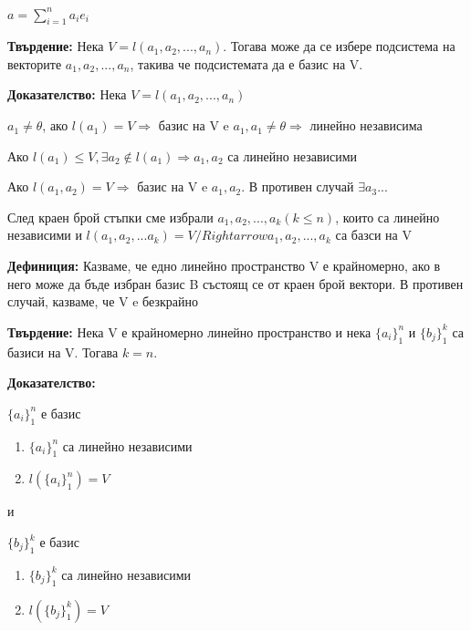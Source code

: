 \documentclass[fleqn,12pt]{article}
\begin{document}
\begin{flushleft}
        $ a = \sum_{i=1}^{n} a_i e_i$

    
    \vspace{5mm}

    \textbf{Твърдение:} Нека $ V = l(a_1, a_2, ..., a_n) $. Тогава може да се избере подсистема на векторите $ a_1, a_2, ..., a_n $, такива че подсистемата да е базис на V.

    \vspace{5mm}
    
        \textbf{Доказателство:}
        Нека $ V = l(a_1, a_2, ..., a_n) $

        $ a_1 \neq \theta $, ако $ l(a_1) = V \Rightarrow $ базис на V e $a_1, a_1 \neq \theta \Rightarrow $ линейно независима

        Ако $ l(a_1) \leq V, \exists a_2 \notin l(a_1) \Rightarrow a_1, a_2 $ са линейно независими

        Ако $ l(a_1, a_2) = V \Rightarrow $ базис на V e $a_1, a_2$. В противен случай $\exists a_3 ...$

        След краен брой стъпки сме избрали $a_1, a_2, ..., a_k (k \leq n) $, които са линейно независими и $l(a_1, a_2, ... a_k) = V /Rightarrow a_1, a_2, ..., a_k $ са базси на V
    
    \vspace{5mm}
    
    \textbf{Дефиниция:} Казваме, че едно линейно пространство V е крайномерно, ако в него може да бъде избран базис B състоящ се от краен брой вектори. В противен случай, казваме, че V e безкрайно

    \vspace{5mm}
    
    \textbf{Твърдение:} Нека V е крайномерно линейно пространство и нека $\{ a_i \}_1^n $ и $\{ b_j \}_1^k $ са базиси на V. Тогава $ k = n $.

    \vspace{5mm}
    
        \textbf{Доказателство:}

        $ \{a_i\}_1^n $ е базис
        \begin{enumerate}
            \item $\{a_i\}_1^n $ са линейно независими
            \item $ l(\{a_i\}_1^n) = V $
        \end{enumerate}

        и

        $ \{b_j\}_1^k $ е базис
        \begin{enumerate}
            \item $\{b_j\}_1^k $ са линейно независими
            \item $ l(\{b_j\}_1^k) = V $
        \end{enumerate}


\end{flushleft}
\end{document}
